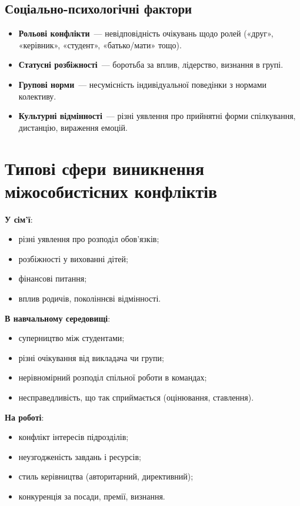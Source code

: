 \documentclass[12pt,a4paper]{article}
\begin{document}
    \subsection*{Соціально-психологічні фактори}
    \begin{itemize}
        \item \textbf{Рольові конфлікти}~--- невідповідність очікувань щодо ролей («друг», «керівник», «студент», «батько/мати» тощо).
        \item \textbf{Статусні розбіжності}~--- боротьба за вплив, лідерство, визнання в групі.
        \item \textbf{Групові норми}~--- несумісність індивідуальної поведінки з нормами колективу.
        \item \textbf{Культурні відмінності}~--- різні уявлення про прийнятні форми спілкування, дистанцію, вираження емоцій.
    \end{itemize}

    \section*{Типові сфери виникнення міжособистісних конфліктів}
    \textbf{У сім’ї}:
    \begin{itemize}
        \item різні уявлення про розподіл обов’язків;
        \item розбіжності у вихованні дітей;
        \item фінансові питання;
        \item вплив родичів, поколіннєві відмінності.
    \end{itemize}

    \textbf{В навчальному середовищі}:
    \begin{itemize}
        \item суперництво між студентами;
        \item різні очікування від викладача чи групи;
        \item нерівномірний розподіл спільної роботи в командах;
        \item несправедливість, що так сприймається (оцінювання, ставлення).
    \end{itemize}

    \textbf{На роботі}:
    \begin{itemize}
        \item конфлікт інтересів підрозділів;
        \item неузгодженість завдань і ресурсів;
        \item стиль керівництва (авторитарний, директивний);
        \item конкуренція за посади, премії, визнання.
    \end{itemize}
\end{document}
